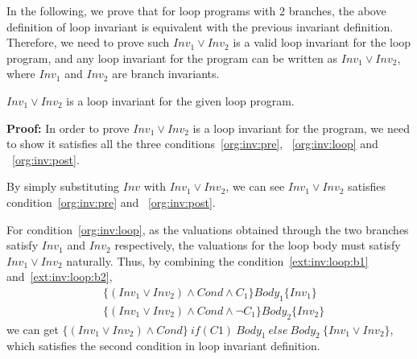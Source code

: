 In the following, we prove that for loop programs with 2 branches, 
the above definition of loop invariant is equivalent with the previous invariant definition.
Therefore, we need to prove such $Inv_1 \vee Inv_2$ is a valid loop invariant for the loop program,
and any loop invariant for the program can be written as $Inv_1 \vee Inv_2$, where $Inv_1$ and $Inv_2$ are branch invariants.


\begin{theorem}
\label{thm:disjunctive:is:invariant}
	$Inv_1 \vee Inv_2$ is a loop invariant for the given loop program.
\end{theorem}

\noindent \textbf{Proof:} In order to prove $Inv_1 \vee Inv_2$ is a loop invariant for the program,
we need to show it satisfies all the three conditions~\ref{org:inv:pre}, ~\ref{org:inv:loop} and ~\ref{org:inv:post}.

By simply substituting $Inv$ with  $Inv_1 \vee Inv_2$,
we can see $Inv_1 \vee Inv_2$ satisfies condition~\ref{org:inv:pre} and ~\ref{org:inv:post}.

For condition~\ref{org:inv:loop},
as the valuations obtained through the two branches satisfy $Inv_1$ and $Inv_2$ respectively, 
the valuations for the loop body must satisfy $Inv_1 \vee Inv_2$ naturally.
Thus, by combining the condition~\ref{ext:inv:loop:b1} and~\ref{ext:inv:loop:b2},
\begin{align*}
&\{(Inv_1 \vee Inv_2) \wedge Cond \wedge C_1\} Body_1 \{Inv_1\} \\
&\{(Inv_1 \vee Inv_2) \wedge Cond \wedge \neg C_1\} Body_2 \{Inv_2\}
\end{align*}
we can get $\{(Inv_1 \vee Inv_2) \wedge Cond\}~if (C1)~{Body_1}~else~{Body_2}~\{Inv_1 \vee Inv_2\}$,
which satisfies the second condition in loop invariant definition.

